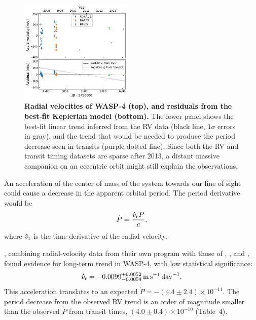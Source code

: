\documentclass[12pt,twocolumn,tighten]{aastex62}
\begin{document}
{\begin{figure}[t]
	\begin{center}
		\leavevmode
		\includegraphics[width=0.48\textwidth]{f6.pdf}
	\end{center}
	\vspace{-0.7cm}
	\caption{
    {\bf Radial velocities of WASP-4 (top), and residuals from the
    best-fit Keplerian model (bottom).} The lower panel shows the
    best-fit linear trend inferred from the RV data (black line,
    $1\sigma$ errors in gray), and the trend that would be needed to
    produce the period decrease seen in transits (purple dotted line).
    Since both the RV and transit timing datasets are sparse after
    2013, a distant massive companion on an eccentric orbit might
    still explain the observations.
	\label{fig:rvs}
  \vspace{-0.3cm}
	}
\end{figure}

An acceleration of the center of mass of the system towards our line
of sight could cause a decrease in the apparent orbital period.  The
period derivative would be
\begin{equation}
	\dot{P} = \frac{\dot{v}_{\rm r} P}{c},
\end{equation}
where $\dot{v}_{\rm r}$ is the time derivative of the radial velocity.

\citet{knutson_friends_2014}, combining radial-velocity data from
their own program with those of \citet{wilson_wasp-4b_2008},
\citet{pont_determining_2011}, and \citet{husnoo_observational_2012},
found evidence for long-term trend in WASP-4, with low statistical significance:
\begin{equation}
  \dot{v}_{\rm r} =
     -0.0099^{+0.0052}_{-0.0054}
     \,{\rm m}\,{\rm s}^{-1}\,{\rm day}^{-1}.
\end{equation}
This acceleration translates to an expected $\dot{P} = -(4.4 \pm 2.4)
\times10^{-11}$. The period decrease from the observed RV trend is an
order of magnitude smaller than the observed $\dot{P}$ from transit
times, $(4.0\pm 0.4)\times10^{-10}$ (Table~4).

}
\end{document}
